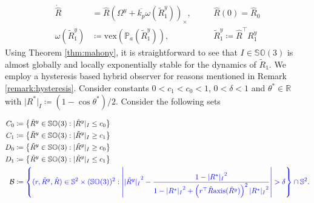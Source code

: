 \documentclass{article}
\newcommand{\SOthree}{\mathbb{SO}(3)}
\newcommand{\axis}[1]{\text{axis}(#1)}
\newcommand{\R}[1]{\mathbb{R}^{#1}}
\newcommand{\Omegay}{\Omega^y}
\newcommand{\vex}[1]{\text{vex}\left(#1\right)}
\newcommand{\brackets}[1]{\left(#1\right)}
\newcommand{\textblue}[1]{\textcolor{blue}{#1}}
\newcommand{\Rtilde}{\tilde{R}}
\newcommand{\normSOthree}[1]{{{\vert}#1 {\vert}_I}}
\newcommand{\Rstar}{{R^*}}
\begin{document}
\begin{subequations}\label{eq:unstable_observer}
\begin{alignat}{3}
    \dot{\hat{R}} &= \hat{R}\left( \Omegay + \overline{k_p}\omega(\Rtilde_1^y)\right)_\times, \quad &&\hat{R}(0) = \hat{R}_0 \\
    \omega(\Rtilde_1^y) &\coloneqq \vex{\mathbb{P}_a({\Rtilde_1^y})}, \quad &&{\Rtilde_1^y \coloneqq \hat{R}^\top R^y_1}
\end{alignat}
\end{subequations}
Using Theorem \ref{thm:mahony}, it is straightforward to see that  $I\in\SOthree$ is almost globally and locally exponentially stable for the dynamics of $\Rtilde_1$. We employ a hysteresis based hybrid observer for reasons mentioned in Remark \ref{remark:hysteresis}. Consider constants $ 0 < c_1 < c_0 < 1$, $0<\delta < 1$ and $\theta^*\in\R{}$ with $\normSOthree{\Rstar}\coloneqq (1 - \cos\theta^*)/2$. Consider the following sets

\begin{subequations}
\begin{align}
    C_0 &\coloneqq {\left\{\Rtilde^y \in \SOthree : \normSOthree{\Rtilde^y} \leq c_0 \right\}}\\
    C_1 &\coloneqq {\left\{\Rtilde^y \in \SOthree : \normSOthree{\Rtilde^y} \geq c_1 \right\}}\\
    D_0 &\coloneqq {\left\{\Rtilde^y \in \SOthree : \normSOthree{\Rtilde^y} \geq c_0 \right\}}\\
    D_1 &\coloneqq {\left\{\Rtilde^y \in \SOthree : \normSOthree{\Rtilde^y} \leq c_1 \right\}}\\
    \mathcal{B} &\coloneqq \textblue{\left\{(r,\Rtilde^y, \hat{R}) \in \mathbb{S}^2\times(\SOthree)^2: \left\lvert \normSOthree{\Rtilde^y}^2 - \frac{1 - \normSOthree{\Rstar}^2}{1 - \normSOthree{\Rstar}^2 + \brackets{r^\top \hat{R}\axis{\Rtilde^y}}^2 \normSOthree{\Rstar}^2} \right\rvert > \delta \right\} \cap \mathbb{S}^2 }.
\end{align}
\end{subequations}
\end{document}

